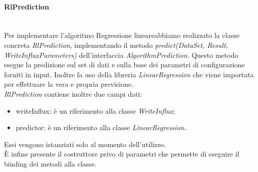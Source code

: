 \paragraph*{RlPrediction} \mbox{}\\ [1mm]
Per implementare l'algoritmo Regressione lineare\glosp abbiamo realizzato la classe concreta \textit{RlPrediction}, implementando il metodo \textit{predict(DataSet, Result, WriteInfluxParameters)} dell'interfaccia \textit{AlgorithmPrediction}.
Questo metodo esegue la predizione sul set di dati e sulla base dei parametri di configurazione forniti in input. Inoltre fa uso della libreria \textit{LinearRegression}  che viene importata per effettuare la vera e propria previsione. \\
\textit{RlPrediction} contiene inoltre due campi dati:
\begin{itemize}
	\item writeInflux: è un riferimento alla classe \textit{WriteInflux};
	\item predictor: è un riferimento alla classe \textit{LinearRegression}.
\end{itemize}
Essi vengono istanziati solo al momento dell'utilizzo. \\
È infine presente il costruttore privo di parametri che permette di eseguire il binding dei metodi alla classe.
